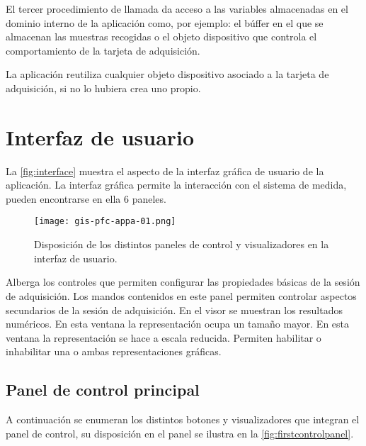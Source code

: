El tercer procedimiento de llamada da acceso a las variables almacenadas en
el dominio interno de la aplicación como, por ejemplo: el búffer en el que se
almacenan las muestras recogidas o el objeto dispositivo que controla el
comportamiento de la tarjeta de adquisición.

La aplicación reutiliza cualquier objeto dispositivo asociado a la tarjeta
de adquisición, si no lo hubiera crea uno propio.


\section{Interfaz de usuario}

La \vref{fig:interface} muestra el aspecto de la interfaz gráfica de
usuario de la aplicación. La interfaz gráfica permite la interacción con el
sistema de medida, pueden encontrarse en ella 6 paneles.

\begin{figure}
    \begin{center}
	\texttt{[image: gis-pfc-appa-01.png]}
    \end{center}
    \caption[Aspecto de la interfaz de usuario]{Disposición de los
	distintos paneles de control y visualizadores en la interfaz de
	usuario.}
    \label{fig:interface}
\end{figure}

\begin{enumerate}
     Alberga los controles que
	permiten configurar las propiedades básicas de la sesión de
	adquisición.
     Los mandos contenidos en
	este panel permiten controlar aspectos secundarios de la sesión de
	adquisición.
     En el visor se muestran los resultados
	numéricos.
     En esta ventana la
	representación ocupa un tamaño mayor.
     En esta ventana la
	representación se hace a escala reducida.
     Permiten habilitar o inhabilitar una o
	ambas representaciones gráficas.
\end{enumerate}


\subsection{Panel de control principal}

A continuación se enumeran los distintos botones y visualizadores que
integran el panel de control, su disposición en el panel se ilustra en la
\vref{fig:firstcontrolpanel}.

